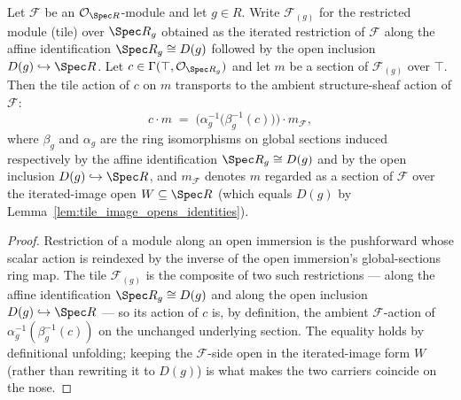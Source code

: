 \begin{lemma}\leanok
  \label{lem:modulesRestrictBasicOpen_smul_eq}
  Let \(\mathcal{F}\) be an \(\mathcal{O}_{\Spec R}\)-module and let \(g \in R\). Write
  \(\mathcal{F}_{(g)}\) for the restricted module (tile) over \(\Spec R_g\) obtained as the iterated
  restriction of \(\mathcal{F}\) along the affine identification \(\Spec R_g \cong D(g)\) followed by the
  open inclusion \(D(g) \hookrightarrow \Spec R\). Let \(c \in \Gamma(\top, \mathcal{O}_{\Spec R_g})\) and
  let \(m\) be a section of \(\mathcal{F}_{(g)}\) over \(\top\). Then the tile action of \(c\) on \(m\)
  transports to the ambient structure-sheaf action of \(\mathcal{F}\):
  \[
    c \cdot m \;=\; \bigl(\alpha_g^{-1}\bigl(\beta_g^{-1}(c)\bigr)\bigr) \cdot m_{\mathcal{F}},
  \]
  where \(\beta_g\) and \(\alpha_g\) are the ring isomorphisms on global sections induced respectively by
  the affine identification \(\Spec R_g \cong D(g)\) and by the open inclusion \(D(g) \hookrightarrow
  \Spec R\), and \(m_{\mathcal{F}}\) denotes \(m\) regarded as a section of \(\mathcal{F}\) over the
  iterated-image open \(W \subseteq \Spec R\) (which equals \(D(g)\) by
  Lemma~\ref{lem:tile_image_opens_identities}).
\end{lemma}
\begin{proof}
  \leanok
  Restriction of a module along an open immersion is the pushforward whose scalar action is reindexed by
  the inverse of the open immersion's global-sections ring map. The tile \(\mathcal{F}_{(g)}\) is the
  composite of two such restrictions --- along the affine identification \(\Spec R_g \cong D(g)\) and along
  the open inclusion \(D(g) \hookrightarrow \Spec R\) --- so its action of \(c\) is, by definition, the
  ambient \(\mathcal{F}\)-action of \(\alpha_g^{-1}(\beta_g^{-1}(c))\) on the unchanged underlying section.
  The equality holds by definitional unfolding; keeping the \(\mathcal{F}\)-side open in the
  iterated-image form \(W\) (rather than rewriting it to \(D(g)\)) is what makes the two carriers
  coincide on the nose.
\end{proof}

